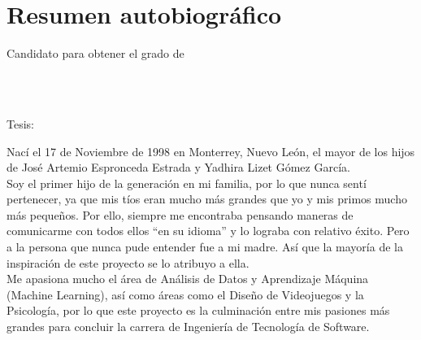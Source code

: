 
\chapter*{Resumen autobiográfico}
\thispagestyle{empty}

\begin{center}
\autor

Candidato para obtener el grado de\\
\grado\\
\orientacion\bigskip

\uanl\\
\fime\bigskip

Tesis:\\
\textsc{\large\titulo}
\end{center}\bigskip

Nací el 17 de Noviembre de 1998 en Monterrey, Nuevo León, el mayor de los hijos de José Artemio Espronceda Estrada y Yadhira Lizet Gómez García. \\
Soy el primer hijo de la generación en mi familia, por lo que nunca sentí pertenecer, ya que mis tíos eran mucho más grandes que yo y mis primos mucho más pequeños. Por ello, siempre me encontraba pensando maneras de comunicarme con todos ellos ``en su idioma'' y lo lograba con relativo éxito. Pero a la persona que nunca pude entender fue a mi madre. Así que la mayoría de la inspiración de este proyecto se lo atribuyo a ella.\\
Me apasiona mucho el área de Análisis de Datos y Aprendizaje Máquina (Machine Learning), así como áreas como el Diseño de Videojuegos y la Psicología, por lo que este proyecto es la culminación entre mis pasiones más grandes para concluir la carrera de Ingeniería de Tecnología de Software.